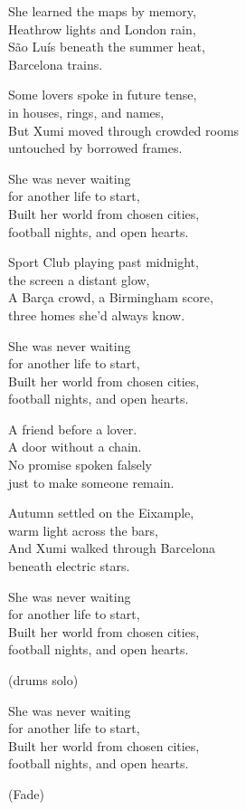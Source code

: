 \begin{lyrics}

She learned the maps by memory,\\
Heathrow lights and London rain,\\
São Luís beneath the summer heat,\\
Barcelona trains.

Some lovers spoke in future tense,\\
in houses, rings, and names,\\
But Xumi moved through crowded rooms\\
untouched by borrowed frames.

She was never waiting\\
for another life to start,\\
Built her world from chosen cities,\\
football nights, and open hearts.

Sport Club playing past midnight,\\
the screen a distant glow,\\
A Barça crowd, a Birmingham score,\\
three homes she’d always know.

She was never waiting\\
for another life to start,\\
Built her world from chosen cities,\\
football nights, and open hearts.

A friend before a lover.\\
A door without a chain.\\
No promise spoken falsely\\
just to make someone remain.

Autumn settled on the Eixample,\\
warm light across the bars,\\
And Xumi walked through Barcelona\\
beneath electric stars.

She was never waiting\\
for another life to start,\\
Built her world from chosen cities,\\
football nights, and open hearts.

(drums solo)

She was never waiting\\
for another life to start,\\
Built her world from chosen cities,\\
football nights, and open hearts.

(Fade)

\end{lyrics}

